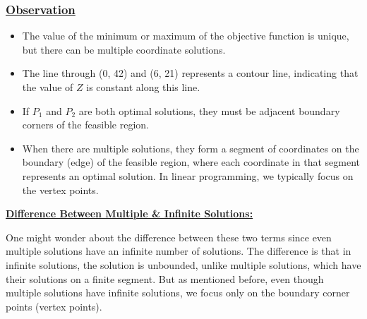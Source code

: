 \vspace{1cm}


\subsubsection*{\underline{Observation}}
\begin{itemize}
    \item The value of the minimum or maximum of the objective function is unique, but there can be multiple coordinate solutions.
    \item The line through (0, 42) and (6, 21) represents a contour line, indicating that the value of \(Z\) is constant along this line.
    \item If \(P_1\) and \(P_2\) are both optimal solutions, they must be adjacent boundary corners of the feasible region.
    \item When there are multiple solutions, they form a segment of coordinates on the boundary (edge) of the feasible region, where each coordinate in that segment represents an optimal solution. In linear programming, we typically focus on the vertex points.
\end{itemize}

\vspace{0.5cm}
\begin{tcolorbox}[title=Note]
\textbf{\underline{Difference Between Multiple \& Infinite Solutions:}}

\vspace{0.25cm}
One might wonder about the difference between these two terms since even multiple solutions have an infinite
number of solutions. The difference is that in infinite solutions, the solution is unbounded, unlike multiple
solutions, which have their solutions on a finite segment. But as mentioned before, even though multiple solutions
have infinite solutions, we focus only on the boundary corner points (vertex points).
\end{tcolorbox}

